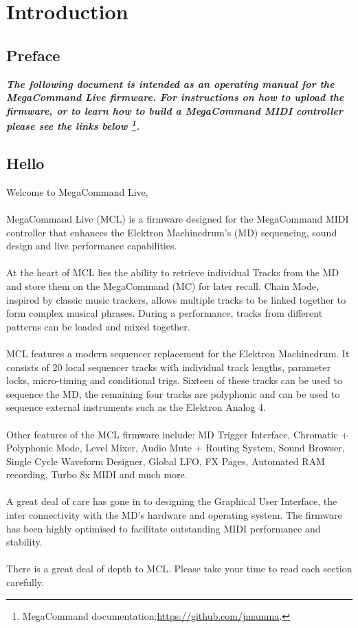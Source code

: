 \chapter{Introduction}

\section{Preface}

\begin{small}
\textbf{\textit{The following document is intended as an operating manual for the MegaCommand Live firmware. For instructions on how to upload the firmware, or to learn how to build a MegaCommand MIDI controller please see the links below \footnote{MegaCommand documentation:\url{https://github.com/jmamma}.}.}}
\end{small}

\section{Hello}
Welcome to MegaCommand Live, 
\\
\\
MegaCommand Live (MCL) is a firmware designed for the MegaCommand MIDI controller that enhances the Elektron Machinedrum's (MD) sequencing, sound design and live performance capabilities.
\\
\\
At the heart of MCL lies the ability to retrieve individual Tracks from the MD and store them on the MegaCommand (MC) for later recall. Chain Mode, inspired by classic music trackers, allows multiple tracks to be linked together to form complex musical phrases. During a performance, tracks from different patterns can be loaded and mixed together.
\\
\\
MCL features a modern sequencer replacement for the Elektron Machinedrum. It consists of 20 local sequencer tracks with individual track lengths, parameter locks, micro-timing and conditional trigs. Sixteen of these tracks can be used to sequence the MD, the remaining four tracks are polyphonic and can be used to sequence external instruments such as the Elektron Analog 4. 
\\
\\
Other features of the MCL firmware include: MD Trigger Interface, Chromatic + Polyphonic Mode,  Level Mixer, Audio Mute + Routing System, Sound Browser, Single Cycle Waveform Designer, Global LFO, FX Pages, Automated RAM recording, Turbo 8x MIDI and much more.
\\
\\
A great deal of care has gone in to designing the Graphical User Interface, the inter connectivity with the MD's hardware and operating system. The firmware has been highly optimised to facilitate outstanding MIDI performance and stability.
\\
\\
There is a great deal of depth to MCL. Please take your time to read each section carefully.